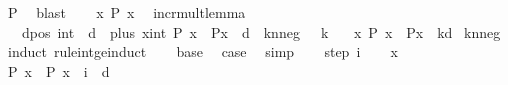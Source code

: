 \begin{isabellebody}
\ P{}\ \isamarkupfalse%
\ blast\isanewline
\ \ \isamarkupfalse%
\ {\isachardoublequoteopen}{\isasymexists}x{\isachardot}{\kern0pt}\ P\ x{\isachardoublequoteclose}\ \isacommand{{\isachardot}{\kern0pt}{\isachardot}{\kern0pt}}\isamarkupfalse%
\isanewline
{}\isamarkupfalse%
%
\endisatagproof
{\isafoldproof}%
%
\isadelimproof
\isanewline
%
\endisadelimproof
\isanewline
{}\isamarkupfalse%
\ incr{\isacharunderscore}{\kern0pt}mult{\isacharunderscore}{\kern0pt}lemma{\isacharcolon}{\kern0pt}\isanewline
\ \ \ dpos{\isacharcolon}{\kern0pt}\ {\isachardoublequoteopen}{\isacharparenleft}{\kern0pt}{}{\isacharcolon}{\kern0pt}{\isacharcolon}{\kern0pt}int{\isacharparenright}{\kern0pt}\ {\isacharless}{\kern0pt}\ d{\isachardoublequoteclose}\ \ plus{\isacharcolon}{\kern0pt}\ {\isachardoublequoteopen}{\isasymforall}x{\isacharcolon}{\kern0pt}{\isacharcolon}{\kern0pt}int{\isachardot}{\kern0pt}\ P\ x\ {\isasymlongrightarrow}\ P{\isacharparenleft}{\kern0pt}x\ {\isacharplus}{\kern0pt}\ d{\isacharparenright}{\kern0pt}{\isachardoublequoteclose}\ \ knneg{\isacharcolon}{\kern0pt}\ {\isachardoublequoteopen}{}\ {\isacharless}{\kern0pt}{\isacharequal}{\kern0pt}\ k{\isachardoublequoteclose}\isanewline
\ \ \ {\isachardoublequoteopen}{\isasymforall}x{\isachardot}{\kern0pt}\ P\ x\ {\isasymlongrightarrow}\ P{\isacharparenleft}{\kern0pt}x\ {\isacharplus}{\kern0pt}\ k{\isacharasterisk}{\kern0pt}d{\isacharparenright}{\kern0pt}{\isachardoublequoteclose}\isanewline
%
\isadelimproof
%
\endisadelimproof
%
\isatagproof
{}\isamarkupfalse%
\ knneg\isanewline
{}\isamarkupfalse%
\ {\isacharparenleft}{\kern0pt}induct\ rule{\isacharcolon}{\kern0pt}int{\isacharunderscore}{\kern0pt}ge{\isacharunderscore}{\kern0pt}induct{\isacharparenright}{\kern0pt}\isanewline
\ \ \isamarkupfalse%
\ base\ \isamarkupfalse%
\ {\isacharquery}{\kern0pt}case\ \isamarkupfalse%
\ simp\isanewline
{}\isamarkupfalse%
\isanewline
\ \ \isamarkupfalse%
\ {\isacharparenleft}{\kern0pt}step\ i{\isacharparenright}{\kern0pt}\isanewline
\ \ \isacommand{{\isacharbraceleft}{\kern0pt}}\isamarkupfalse%
\isamarkupfalse%
\ x\isanewline
\ \ \ \ \isamarkupfalse%
\ {\isachardoublequoteopen}P\ x\ {\isasymlongrightarrow}\ P\ {\isacharparenleft}{\kern0pt}x\ {\isacharplus}{\kern0pt}\ i\ {\isacharasterisk}{\kern0pt}\ d{\isacharparenright}{\kern0pt}{\isachardoublequoteclose}\ \isamarkupfalse%

\end{isabellebody}
